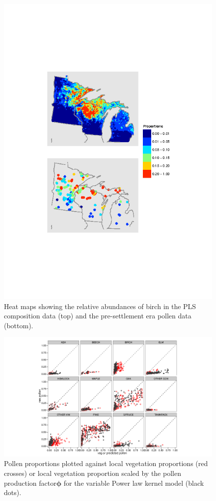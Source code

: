 \begin{figure}
\centering
\includegraphics[width=7in]{figures/maps_compare_BIRCH_mod.png}
\caption{Heat maps showing the relative abundances of birch in the PLS
  composition data (top) and the pre-settlement era pollen data
  (bottom).}
\label{fig:compare_maps_BIRCH}
\end{figure}

\begin{figure}
\centering
\includegraphics[width=7in]{figures/pollen_phi_scaled_pl_Ka_Kgamma.png}
\caption{Pollen proportions plotted against local vegetation
  proportions (red crosses) or local vegetation proportion scaled by
  the pollen production factor$\bm{\phi}$ for the variable Power law
  kernel model (black dots).}
\label{fig:focal_scaled}
\end{figure}

